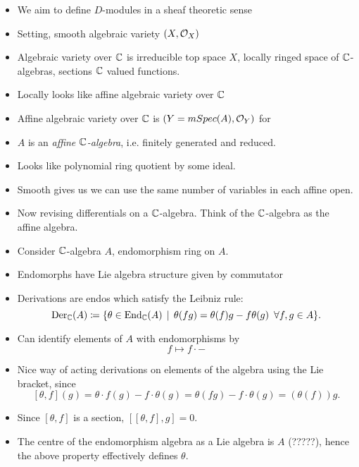\documentclass[a4paper]{article}
\begin{document}
\maketitle
\begin{itemize}
    \item We aim to define $D$-modules in a sheaf theoretic sense
    \item Setting, smooth algebraic variety $(X, \mathcal{O}_X)$
    \item Algebraic variety over $\mathbb{C}$ is irreducible top space $X$, locally ringed space of $\mathbb{C}$-algebras, sections $\mathbb{C}$ valued functions.
    \item Locally looks like affine algebraic variety over $\mathbb{C}$
    \item Affine algebraic variety over $\mathbb{C}$ is $(Y=mSpec(A), \mathcal{O}_Y)$ for
    \item $A$ is an \emph{affine $\mathbb{C}$-algebra}, i.e. finitely generated and reduced.
    \item Looks like polynomial ring quotient by some ideal.
    \item Smooth gives us we can use the same number of variables in each affine open.
    \item Now revising differentials on a $\mathbb{C}$-algebra. Think of the $\mathbb{C}$-algebra as the affine algebra.
    \item Consider $\mathbb{C}$-algebra $A$, endomorphism ring on $A$.
    \item Endomorphs have Lie algebra structure given by commutator
    \item Derivations are endos which satisfy the Leibniz rule:
        \[
            \operatorname{Der}_{\mathbb{C}}(A) \coloneqq \{\theta \in \operatorname{End}_{\mathbb{C}}(A) \,\mid\, \theta(fg) = \theta(f)g - f\theta(g) \,\,\,\forall f,g\in A\}.
        \]
    \item Can identify elements of $A$ with endomorphisms by
        \[
            f \mapsto f\cdot -
        \]
    \item Nice way of acting derivations on elements of the algebra using the Lie bracket, since
        \[
            [\theta, f](g) = \theta \cdot f(g) - f \cdot \theta(g) = \theta(fg) - f \cdot \theta(g) = (\theta(f))g.
        \]
    \item Since $[\theta, f]$ is a section, $[ [\theta, f], g] = 0$. 
    \item The centre of the endomorphism algebra as a Lie algebra is $A$ (?????), hence the above property effectively defines $\theta$. 

\end{itemize}
\end{document}
